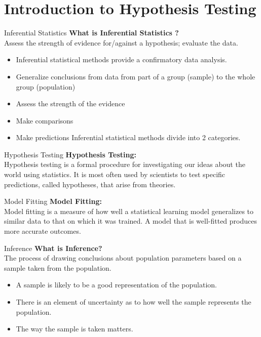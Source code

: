 


\maketitle
\section{Introduction to Hypothesis Testing}
\begin{frame}[t]{Inferential Statistics}
    \textbf{What is Inferential Statistics ?} \\
    \vspace{10px}
    Assess the strength of evidence for/against a hypothesis; evaluate the data.
    \begin{itemize}
 		\item Inferential statistical methods provide a confirmatory data analysis.
 		\item  Generalize conclusions from data from part of a group (sample) to the whole group (population)
 		\item Assess the strength of the evidence
 	    \item Make comparisons
 		\item Make predictions Inferential statistical methods divide into 2 categories.
    \end{itemize}

\end{frame}
\begin{frame}[t]{Hypothesis Testing}
	 \textbf{Hypothesis Testing:} \\
	 Hypothesis testing is a formal procedure for investigating our ideas about the world using statistics. It is most often used by scientists to test specific predictions, called hypotheses, that arise from theories.
\end{frame}
\begin{frame}[t]{Model Fitting}
	\textbf{Model Fitting:} \\
	Model fitting is a measure of how well a statistical learning model generalizes to similar data to that on which it was trained. A model that is well-fitted produces more accurate outcomes.
\end{frame}
\begin{frame}[t]{Inference}
	\textbf{What is Inference?} \\
	The process of drawing conclusions about population parameters based on a sample taken from the population. \\
	\begin{itemize}
		\item A sample is likely to be a good representation of the population.
		\item There is an element of uncertainty as to how well the sample represents the population.
		\item The way the sample is taken matters.
	\end{itemize}
\end{frame}
